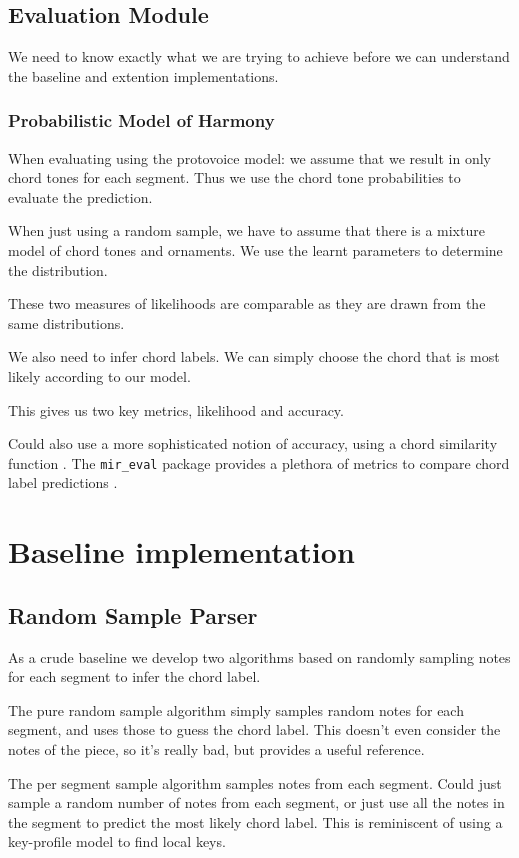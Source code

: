 \documentclass[12pt,a4paper,twoside,openright]{report}
\theoremstyle{definition}
\begin{document}
\subsection{Evaluation Module}
We need to know exactly what we are trying to achieve before we can understand the baseline and extention implementations.

\FloatBarrier
\subsubsection{Probabilistic Model of Harmony}
When evaluating using the protovoice model: we assume that we result in only chord tones for each segment. Thus we use the chord tone probabilities to evaluate the prediction. 
\par
When just using a random sample, we have to assume that there is a mixture model of chord tones and ornaments. We use the learnt parameters to determine the distribution.
\par
These two measures of likelihoods are comparable as they are drawn from the same distributions.
\par
We also need to infer chord labels. We can simply choose the chord that is most likely according to our model.
\par 
This gives us two key metrics, likelihood and accuracy.
\par
Could also use a more sophisticated notion of accuracy, using a chord similarity function \cite{humphreyFourTimelyInsights2015}. The {\texttt {mir\_eval}} package provides a plethora of metrics to compare chord label predictions \cite{raffelMirEvalTransparent2014}. 

\section{Baseline implementation}


\subsection{Random Sample Parser}
As a crude baseline we develop two algorithms based on randomly sampling notes for each segment to infer the chord label. 
\par
The pure random sample algorithm simply samples random notes for each segment, and uses those to guess the chord label. This doesn't even consider the notes of the piece, so it's really bad, but provides a useful reference.
\par 
The per segment sample algorithm samples notes from each segment. Could just sample a random number of notes from each segment, or just use all the notes in the segment to predict the most likely chord label. This is reminiscent of using a key-profile model \cite{temperleyBayesianApproachKeyFinding2002} to find local keys.
\end{document}

